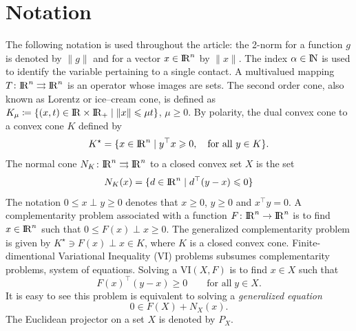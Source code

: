 \newcommand{\tb}[1]{\textcolor{blue}{#1}}
\newcommand{\tg}[1]{\textcolor{applegreen}{#1}}
\newcommand{\moh}[1]{\textcolor{applegreen}{#1}}
\newcommand{\MM}[0]{\rightrightarrows}









\section*{Notation}

The following notation is used throughout the article: the 2-norm for a function $g$ is denoted  by $\|g\|$ and for a vector $x\in\mathrm{I\!R}^n$ by $\|x\|$. 
The index $\alpha\in\mathrm{I\!N}$ is used to identify the variable pertaining to a single contact.
A multivalued mapping $T\colon\RR^n\MM\RR^n$ is an operator whose images are sets.
The second order cone, also known as Lorentz or ice--cream cone, is defined as $K_\mu \coloneqq\{(x, t)\in\mathrm{I\!R}\times\mathrm{I\!R}_+\mid \|x\|\leqslant \mu t\}$, $\mu\geq0$.
By polarity, the dual convex cone to a convex cone $K$ defined by
\begin{equation}
  \label{eq:dual-cone}
  K^\star = \{x \in \RR^n \mid  y^\top x \geq 0, \quad \text{for all } y \in K\}.
\end{equation}
The normal cone $N_K\colon\RR^n\MM\RR^n$ to a closed convex set $X$ is the set
\begin{equation}
 N_K(x) = \{d\in\mathrm{I\!R}^n\mid d^\top(y - x) \leqslant 0\}
\end{equation}
The notation $0\leq x\perp y\geq 0$ denotes that $x\geq0$, $y\geq0$ and $x^\top y = 0$.
A complementarity problem associated with a function $F\colon \mathrm{I\!R}^n\to\mathrm{I\!R}^n$ is to find $x\in\mathrm{I\!R}^n$ such that $0\leq F(x) \perp x \geq 0$.
The generalized complementarity problem is given by $K^\star\ni F(x) \perp x \in K$, where $K$ is a closed convex cone.
Finite-dimentional Variational Inequality (VI) problems subsumes complementarity problems, system of equations.
Solving a $\mathrm{VI}(X,F)$ is to find $x\in X$ such that
%
\begin{equation}
 F(x)^\top(y - x)\geq 0\qquad\text{for all}\; y\in X.
\end{equation}
%
It is easy to see this problem is equivalent to solving a \emph{generalized equation}
\begin{equation}
 0 \in F(X) + N_X(x).
\end{equation}
The Euclidean projector on a set $X$ is denoted by $P_X$.

